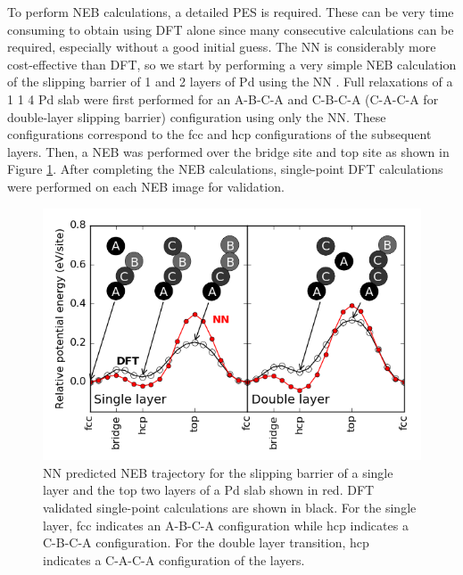 \documentclass[12pt]{cmuthesis}
\begin{document}
To perform NEB calculations, a detailed PES is required. These can be very time consuming to obtain using DFT alone since many consecutive calculations can be required, especially without a good initial guess. The NN is considerably more cost-effective than DFT, so we start by performing a very simple NEB calculation of the slipping barrier of 1 and 2 layers of Pd using the NN \cite{boes-2016-neural-networ}. Full relaxations of a 1 \texttimes{} 1 \texttimes{} 4 Pd slab were first performed for an A-B-C-A and C-B-C-A (C-A-C-A for double-layer slipping barrier) configuration using only the NN. These configurations correspond to the fcc and hcp configurations of the subsequent layers. Then, a NEB was performed over the bridge site and top site as shown in Figure \ref{fig-Pd-slipping-NEB}. After completing the NEB calculations, single-point DFT calculations were performed on each NEB image for validation.

\begin{figure}[htbp]
\centering
\includegraphics[width=5in]{./images/Pd-slipping-NEB.png}
\caption{\label{fig-Pd-slipping-NEB}
NN predicted NEB trajectory for the slipping barrier of a single layer and the top two layers of a Pd slab shown in red. DFT validated single-point calculations are shown in black. For the single layer, fcc indicates an A-B-C-A configuration while hcp indicates a C-B-C-A configuration. For the double layer transition, hcp indicates a C-A-C-A configuration of the layers.}
\end{figure}
\end{document}
